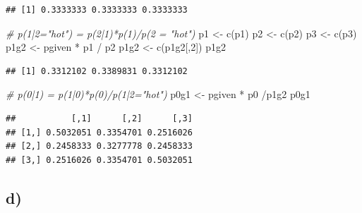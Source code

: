 \documentclass[
]{article}
\newenvironment{Shaded}{\begin{snugshade}}{\end{snugshade}}
\newcommand{\CommentTok}[1]{\textcolor[rgb]{0.56,0.35,0.01}{\textit{#1}}}
\newcommand{\DecValTok}[1]{\textcolor[rgb]{0.00,0.00,0.81}{#1}}
\newcommand{\FunctionTok}[1]{\textcolor[rgb]{0.00,0.00,0.00}{#1}}
\newcommand{\NormalTok}[1]{#1}
\newcommand{\OtherTok}[1]{\textcolor[rgb]{0.56,0.35,0.01}{#1}}
\newcommand{\SpecialCharTok}[1]{\textcolor[rgb]{0.00,0.00,0.00}{#1}}
\begin{document}
\begin{verbatim}
## [1] 0.3333333 0.3333333 0.3333333
\end{verbatim}

\begin{Shaded}
\begin{Highlighting}[]
\CommentTok{\# p(1|2="hot") = p(2|1)*p(1)/p(2 = "hot")}
\NormalTok{p1 }\OtherTok{\textless{}{-}} \FunctionTok{c}\NormalTok{(p1)}
\NormalTok{p2 }\OtherTok{\textless{}{-}} \FunctionTok{c}\NormalTok{(p2)}
\NormalTok{p3 }\OtherTok{\textless{}{-}} \FunctionTok{c}\NormalTok{(p3)}
\NormalTok{p1g2 }\OtherTok{\textless{}{-}}\NormalTok{ pgiven }\SpecialCharTok{*}\NormalTok{ p1 }\SpecialCharTok{/}\NormalTok{ p2 }
\NormalTok{p1g2 }\OtherTok{\textless{}{-}} \FunctionTok{c}\NormalTok{(p1g2[,}\DecValTok{2}\NormalTok{])}
\NormalTok{p1g2}
\end{Highlighting}
\end{Shaded}

\begin{verbatim}
## [1] 0.3312102 0.3389831 0.3312102
\end{verbatim}

\begin{Shaded}
\begin{Highlighting}[]
\CommentTok{\# p(0|1) = p(1|0)*p(0)/p(1|2="hot")}
\NormalTok{p0g1 }\OtherTok{\textless{}{-}}\NormalTok{ pgiven }\SpecialCharTok{*}\NormalTok{ p0 }\SpecialCharTok{/}\NormalTok{p1g2}
\NormalTok{p0g1}
\end{Highlighting}
\end{Shaded}

\begin{verbatim}
##           [,1]      [,2]      [,3]
## [1,] 0.5032051 0.3354701 0.2516026
## [2,] 0.2458333 0.3277778 0.2458333
## [3,] 0.2516026 0.3354701 0.5032051
\end{verbatim}

\hypertarget{d}{%
\subsection{d)}\label{d}}
\end{document}

